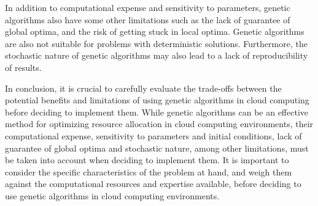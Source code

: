 In addition to computational expense and sensitivity to parameters, genetic algorithms also have some other limitations such as the lack of guarantee of global optima, and the risk of getting stuck in local optima. Genetic algorithms are also not suitable for problems with deterministic solutions. Furthermore, the stochastic nature of genetic algorithms may also lead to a lack of reproducibility of results.

In conclusion, it is crucial to carefully evaluate the trade-offs between the potential benefits and limitations of using genetic algorithms in cloud computing before deciding to implement them. While genetic algorithms can be an effective method for optimizing resource allocation in cloud computing environments, their computational expense, sensitivity to parameters and initial conditions, lack of guarantee of global optima and stochastic nature, among other limitations, must be taken into account when deciding to implement them. It is important to consider the specific characteristics of the problem at hand, and weigh them against the computational resources and expertise available, before deciding to use genetic algorithms in cloud computing environments.